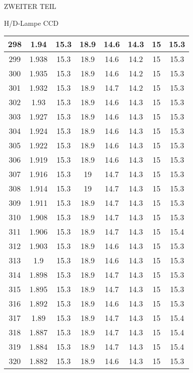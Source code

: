 \begin{appendix}
\begin{chapter}{ZWEITER TEIL}
\begin{section}{H/D-Lampe CCD}
\begin{scriptsize}
\begin{longtable}[htbp]{|c|c|c|c|c|c|c|c|}
            298 & 1.94 & 15.3 & 18.9 & 14.6 & 14.3 & 15 & 15.3 \\ \hline
            299 & 1.938 & 15.3 & 18.9 & 14.6 & 14.2 & 15 & 15.3 \\ \hline
            300 & 1.935 & 15.3 & 18.9 & 14.6 & 14.2 & 15 & 15.3 \\ \hline
            301 & 1.932 & 15.3 & 18.9 & 14.7 & 14.2 & 15 & 15.3 \\ \hline
            302 & 1.93 & 15.3 & 18.9 & 14.6 & 14.3 & 15 & 15.3 \\ \hline
            303 & 1.927 & 15.3 & 18.9 & 14.6 & 14.3 & 15 & 15.3 \\ \hline
            304 & 1.924 & 15.3 & 18.9 & 14.6 & 14.3 & 15 & 15.3 \\ \hline
            305 & 1.922 & 15.3 & 18.9 & 14.6 & 14.3 & 15 & 15.3 \\ \hline
            306 & 1.919 & 15.3 & 18.9 & 14.6 & 14.3 & 15 & 15.3 \\ \hline
            307 & 1.916 & 15.3 & 19 & 14.7 & 14.3 & 15 & 15.3 \\ \hline
            308 & 1.914 & 15.3 & 19 & 14.7 & 14.3 & 15 & 15.3 \\ \hline
            309 & 1.911 & 15.3 & 18.9 & 14.7 & 14.3 & 15 & 15.3 \\ \hline
            310 & 1.908 & 15.3 & 18.9 & 14.7 & 14.3 & 15 & 15.3 \\ \hline
            311 & 1.906 & 15.3 & 18.9 & 14.7 & 14.3 & 15 & 15.4 \\ \hline
            312 & 1.903 & 15.3 & 18.9 & 14.6 & 14.3 & 15 & 15.3 \\ \hline
            313 & 1.9 & 15.3 & 18.9 & 14.6 & 14.3 & 15 & 15.3 \\ \hline
            314 & 1.898 & 15.3 & 18.9 & 14.7 & 14.3 & 15 & 15.3 \\ \hline
            315 & 1.895 & 15.3 & 18.9 & 14.7 & 14.3 & 15 & 15.3 \\ \hline
            316 & 1.892 & 15.3 & 18.9 & 14.6 & 14.3 & 15 & 15.3 \\ \hline
            317 & 1.89 & 15.3 & 18.9 & 14.7 & 14.3 & 15 & 15.4 \\ \hline
            318 & 1.887 & 15.3 & 18.9 & 14.7 & 14.3 & 15 & 15.4 \\ \hline
            319 & 1.884 & 15.3 & 18.9 & 14.7 & 14.3 & 15 & 15.4 \\ \hline
            320 & 1.882 & 15.3 & 18.9 & 14.6 & 14.3 & 15 & 15.3 \\ \hline

\end{longtable}
\end{scriptsize}
\end{section}
\end{chapter}
\end{appendix}
